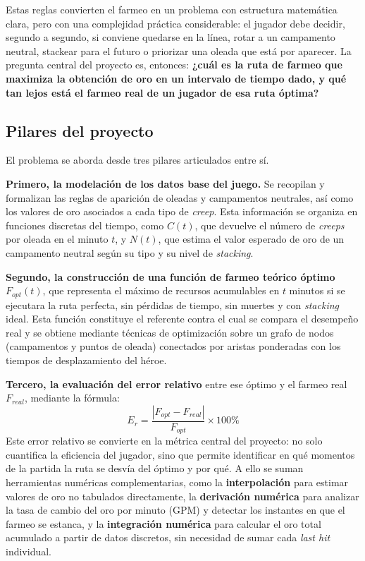 Estas reglas convierten el farmeo en un problema con estructura matemática clara, pero con una complejidad práctica considerable: el jugador debe decidir, segundo a segundo, si conviene quedarse en la línea, rotar a un campamento neutral, stackear para el futuro o priorizar una oleada que está por aparecer. La pregunta central del proyecto es, entonces: \textbf{¿cuál es la ruta de farmeo que maximiza la obtención de oro en un intervalo de tiempo dado, y qué tan lejos está el farmeo real de un jugador de esa ruta óptima?}

\subsection{Pilares del proyecto}

El problema se aborda desde tres pilares articulados entre sí.

\textbf{Primero, la modelación de los datos base del juego.} Se recopilan y formalizan las reglas de aparición de oleadas y campamentos neutrales, así como los valores de oro asociados a cada tipo de \textit{creep}. Esta información se organiza en funciones discretas del tiempo, como \(C(t)\), que devuelve el número de \textit{creeps} por oleada en el minuto \(t\), y \(N(t)\), que estima el valor esperado de oro de un campamento neutral según su tipo y su nivel de \textit{stacking}.

\textbf{Segundo, la construcción de una función de farmeo teórico óptimo} \(F_{opt}(t)\), que representa el máximo de recursos acumulables en \(t\) minutos si se ejecutara la ruta perfecta, sin pérdidas de tiempo, sin muertes y con \textit{stacking} ideal. Esta función constituye el referente contra el cual se compara el desempeño real y se obtiene mediante técnicas de optimización sobre un grafo de nodos (campamentos y puntos de oleada) conectados por aristas ponderadas con los tiempos de desplazamiento del héroe.

\textbf{Tercero, la evaluación del error relativo} entre ese óptimo y el farmeo real \(F_{real}\), mediante la fórmula:
\[
E_r = \frac{|F_{opt} - F_{real}|}{F_{opt}} \times 100\%
\]
Este error relativo se convierte en la métrica central del proyecto: no solo cuantifica la eficiencia del jugador, sino que permite identificar en qué momentos de la partida la ruta se desvía del óptimo y por qué. A ello se suman herramientas numéricas complementarias, como la \textbf{interpolación} para estimar valores de oro no tabulados directamente, la \textbf{derivación numérica} para analizar la tasa de cambio del oro por minuto (GPM) y detectar los instantes en que el farmeo se estanca, y la \textbf{integración numérica} para calcular el oro total acumulado a partir de datos discretos, sin necesidad de sumar cada \textit{last hit} individual.

